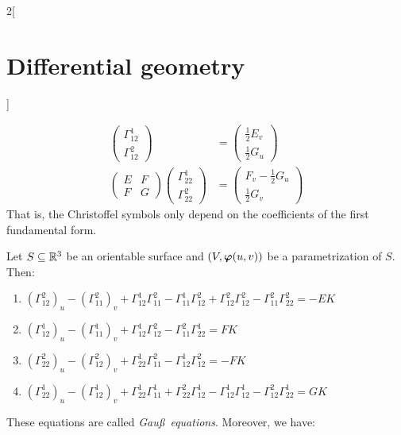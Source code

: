 \documentclass[../../../main.tex]{subfiles}
\begin{document}
\begin{multicols}{2}[\section{Differential geometry}]
\begin{proposition}
\begin{align*}
\begin{pmatrix}
        \Gamma_{12}^1 \\
        \Gamma_{12}^2
      \end{pmatrix} & =\begin{pmatrix}
                         \frac{1}{2}E_v \\
                         \frac{1}{2}G_u
                       \end{pmatrix}     \\
      \begin{pmatrix}
        E & F \\
        F & G
      \end{pmatrix}
      \begin{pmatrix}
        \Gamma_{22}^1 \\
        \Gamma_{22}^2
      \end{pmatrix} & =\begin{pmatrix}
                         F_v-\frac{1}{2}G_u \\
                         \frac{1}{2}G_v
                       \end{pmatrix}
    \end{align*}
    That is, the Christoffel symbols only depend on the coefficients of the first fundamental form.
  \end{proposition}
  \begin{proposition}
    Let $S\subseteq\mathbb{R}^3$ be an orientable surface and $(V,\boldsymbol{\mathrm{\varphi}}(u,v))$ be a parametrization of $S$. Then:
    \begin{enumerate}
      \item $\displaystyle {\left(\Gamma_{12}^2\right)}_u-{\left(\Gamma_{11}^2\right)}_v +\Gamma_{12}^1\Gamma_{11}^2-\Gamma_{11}^1\Gamma_{12}^2+\Gamma_{12}^2\Gamma_{12}^2-\Gamma_{11}^2\Gamma_{22}^2=-EK$
      \item $\displaystyle {\left(\Gamma_{12}^1\right)}_u-{\left(\Gamma_{11}^1\right)}_v +\Gamma_{12}^1\Gamma_{12}^2-\Gamma_{11}^2\Gamma_{22}^1=FK$
      \item $\displaystyle {\left(\Gamma_{22}^2\right)}_u-{\left(\Gamma_{12}^2\right)}_v +\Gamma_{22}^1\Gamma_{11}^2-\Gamma_{12}^1\Gamma_{12}^2=-FK$
      \item $\displaystyle {\left(\Gamma_{22}^1\right)}_u-{\left(\Gamma_{12}^1\right)}_v +\Gamma_{22}^1\Gamma_{11}^1+\Gamma_{22}^2\Gamma_{12}^1-\Gamma_{12}^1\Gamma_{12}^1-\Gamma_{12}^2\Gamma_{22}^1=GK$
    \end{enumerate}
    These equations are called \emph{Gau\ss\ equations}. Moreover, we have:
    \begin{enumerate}\setcounter{enumi}{4}

\end{enumerate}
\end{proposition}
\end{multicols}
\end{document}
